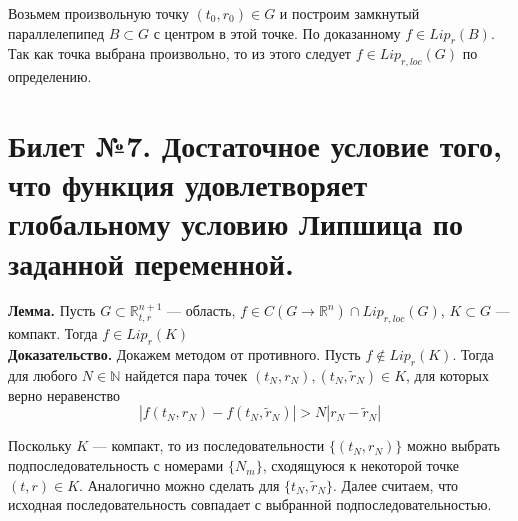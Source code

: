 \documentclass{article}
\begin{document}
Возьмем произвольную точку $(t_0, r_0) \in G$ и построим замкнутый параллелепипед $B \subset G$ с центром в этой точке. По доказанному $f \in Lip_r(B)$. Так как точка выбрана произвольно, то из этого следует $f \in Lip_{r,loc}(G)$ по определению.

\section{Билет №7. Достаточное условие того, что функция удовлетворяет глобальному условию Липшица по заданной переменной.}
\textbf{Лемма.} Пусть $G \subset \mathbb{R}_{t,r}^{n+1}$ --- область, $f \in C(G \to \mathbb{R}^n)\cap Lip_{r,loc}(G)$, $K \subset G$ --- компакт. Тогда $f \in Lip_r(K)$\\
\noindent \textbf{Доказательство.} Докажем методом от противного. Пусть $f \notin Lip_r(K)$. Тогда для любого $N \in \mathbb{N}$ найдется пара точек $(t_N,r_N), (t_N, \widetilde{r}_N) \in K$, для которых верно неравенство
\begin{equation}
    |f(t_N, r_N) - f(t_N, \widetilde{r}_N)| > N|r_N - \widetilde{r}_N| \label{badlip}
\end{equation}

Поскольку $K$ --- компакт, то из последовательности $\{(t_N, r_N)\}$ можно выбрать подпоследовательность с номерами $\{N_m\}$, сходящуюся к некоторой точке $(t,r) \in K$. Аналогично можно сделать для $\{t_N, \widetilde{r}_N\}$. Далее считаем, что исходная последовательность совпадает с выбранной подпоследовательностью.
\end{document}
